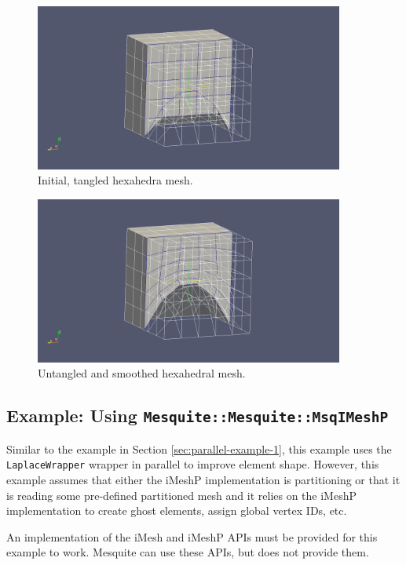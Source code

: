 \begin{figure}[htpb]
\begin{center}
\includegraphics[width=4in]{figures/par-hex-orig}
\caption{Initial, tangled hexahedra mesh.}
\label{fig:par_hex_orig}
\end{center}
\end{figure}

\begin{figure}[htpb]
\begin{center}
\includegraphics[width=4in]{figures/par-hex-smoothed}
\caption{Untangled and smoothed hexahedral mesh.}
\label{fig:par_hex_smoothed}
\end{center}
\end{figure}

\subsection{Example: Using \texttt{Mesquite::Mesquite::MsqIMeshP}}

Similar to the example in Section \ref{sec:parallel-example-1}, this example uses the \texttt{LaplaceWrapper} wrapper in parallel to improve element shape.  However, this example assumes that either the iMeshP implementation is partitioning or that it is reading some pre-defined partitioned mesh and it relies on the iMeshP implementation to create ghost elements, assign global vertex IDs, etc.

An implementation of the iMesh and iMeshP APIs must be provided for this example to work.  Mesquite can use these APIs, but does not provide them.

